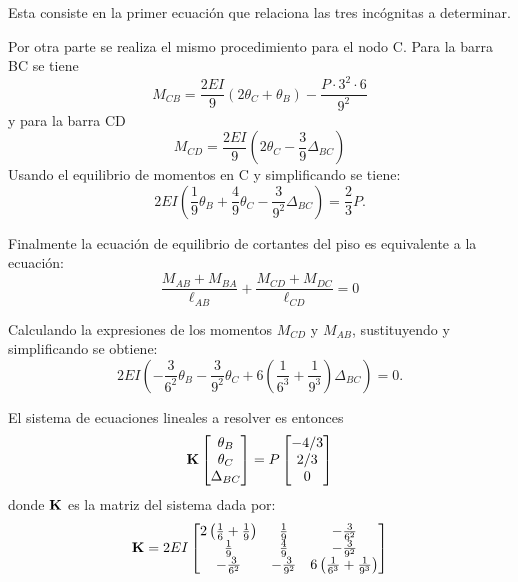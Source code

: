 Esta consiste en la primer ecuación que relaciona las tres incógnitas a determinar.

Por otra parte se realiza el mismo procedimiento para el nodo C. Para la barra BC se tiene
\begin{equation}
M_{CB} = \frac{2EI}{9} (2\theta_C +\theta_B ) - \frac{P \cdot 3^2 \cdot 6}{9^2}
\end{equation}
y para la barra CD
\begin{equation}
M_{CD} = \frac{2EI}{9} (2\theta_C - \frac{3}{9} \Delta_{BC} )
\end{equation}
Usando el equilibrio de momentos en C y simplificando se tiene:
\begin{equation}
\boxed{
	2EI \left( \frac{1}{9} \theta_B + \frac{4}{9} \theta_C - \frac{3 }{9^2} \Delta_{BC} \right) = \frac{2}{3} P.
}
\end{equation}

Finalmente la ecuación de equilibrio de cortantes del piso es equivalente a la ecuación:
\begin{equation}
\frac{M_{AB}+M_{BA}}{\ell_{AB}}
+ 
\frac{M_{CD}+M_{DC}}{\ell_{CD}} = 0
\end{equation}

Calculando la expresiones de los momentos $M_{CD}$ y $M_{AB}$, sustituyendo y simplificando se obtiene:
\begin{equation}
\boxed{
	2EI \left( -\frac{3}{6^2} \theta_B - \frac{3}{9^2} \theta_C + 6 \left( \frac{1}{6^3} +  \frac{1}{9^3} \right) \Delta_{BC} \right) = 0.
}
\end{equation}

El sistema de ecuaciones lineales a resolver es entonces
\begin{equation}
{\bf K}   
\left[
\begin{matrix}
\theta_B\\
\theta_C\\
\Delta_{BC}
\end{matrix}
\right]
=
P
\left[
\begin{matrix}
-4/3\\
2/3\\
0
\end{matrix}
\right]
\end{equation}
donde ${\bf K}$ es la matriz del sistema dada por: 
\begin{equation}
{\bf K} =
2EI \left[
\begin{matrix}
2 \left( \frac{1}{6}+ \frac{1}{9}\right) & \frac{1}{9} & -\frac{3}{6^2}\\
\frac{1}{9} & \frac{4}{9} & -\frac{3}{9^2}\\
-\frac{3}{6^2} & -\frac{3}{9^2} &  6\left( \frac{1}{6^3}  + \frac{1}{9^3}\right)
\end{matrix}
\right]
\end{equation}

